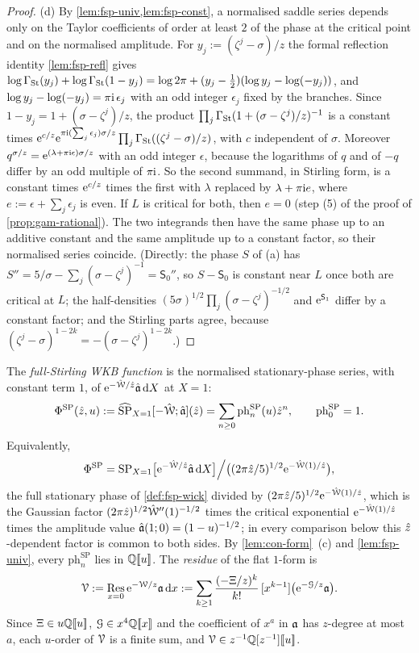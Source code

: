 \begin{proof}
(d) By \cref{lem:fsp-univ,lem:fsp-const}, a normalised saddle series depends only on the Taylor coefficients of order at least $2$ of the phase at the critical point and on the normalised amplitude. For $y_j:=(\zeta^j-\sigma)/z$ the formal reflection identity \cref{lem:fsp-refl} gives $\log\Gamma_{\mathrm{St}}(y_j)+\log\Gamma_{\mathrm{St}}(1-y_j)=\log2\pi+(y_j-\frac12)(\log y_j-\log(-y_j))$, and $\log y_j-\log(-y_j)=\pi\mathrm{i}\,\epsilon_j$ with an odd integer $\epsilon_j$ fixed by the branches. Since $1-y_j=1+(\sigma-\zeta^j)/z$, the product $\prod_j\Gamma_{\mathrm{St}}(1+(\sigma-\zeta^j)/z)^{-1}$ is a constant times $\mathrm{e}^{c/z}\mathrm{e}^{\pi\mathrm{i}(\sum_j\epsilon_j)\sigma/z}\prod_j\Gamma_{\mathrm{St}}((\zeta^j-\sigma)/z)$, with $c$ independent of $\sigma$. Moreover $q^{\sigma/z}=\mathrm{e}^{(\lambda+\pi\mathrm{i}\epsilon)\sigma/z}$ with an odd integer $\epsilon$, because the logarithms of $q$ and of $-q$ differ by an odd multiple of $\pi\mathrm{i}$. So the second summand, in Stirling form, is a constant times $\mathrm{e}^{c/z}$ times the first with $\lambda$ replaced by $\lambda+\pi\mathrm{i} e$, where $e:=\epsilon+\sum_j\epsilon_j$ is even. If $L$ is critical for both, then $e=0$ (step (5) of the proof of \cref{prop:gam-rational}). The two integrands then have the same phase up to an additive constant and the same amplitude up to a constant factor, so their normalised series coincide. (Directly: the phase $S$ of (a) has $S''=5/\sigma-\sum_j(\sigma-\zeta^j)^{-1}=\mathsf S_0''$, so $S-\mathsf S_0$ is constant near $L$ once both are critical at $L$; the half-densities $(5\sigma)^{1/2}\prod_j(\sigma-\zeta^j)^{-1/2}$ and $\mathrm{e}^{\mathsf S_1}$ differ by a constant factor; and the Stirling parts agree, because $(\zeta^j-\sigma)^{1-2k}=-(\sigma-\zeta^j)^{1-2k}$.)
\end{proof}

\begin{defn}
\label{def:con-PhiSP}
The \emph{full-Stirling WKB function} is the normalised stationary-phase series, with constant term $1$, of $\mathrm{e}^{-\hat{\mathcal{W}}/\hat{z}}\hat{\mathfrak{a}}\,\mathrm{d} X$ at $X=1$:
\[
\Phi^{\mathrm{SP}}(\hat{z},u):=\widehat{\mathrm{SP}}_{X=1}[-\hat{\mathcal{W}};\hat{\mathfrak{a}}](\hat{z})=\sum_{n\geq0}\mathrm{ph}^{\mathrm{SP}}_n(u)\hat{z}^n,\qquad\mathrm{ph}^{\mathrm{SP}}_0=1 .
\]
Equivalently,
\[
\Phi^{\mathrm{SP}}=\mathrm{SP}_{X=1}\bigl[\mathrm{e}^{-\hat{\mathcal{W}}/\hat{z}}\hat{\mathfrak{a}}\,\mathrm{d} X\bigr]\Big/\bigl((2\pi\hat{z}/5)^{1/2}\mathrm{e}^{-\hat{\mathcal{W}}(1)/\hat{z}}\bigr),
\]
the full stationary phase of \cref{def:fsp-wick} divided by $(2\pi\hat{z}/5)^{1/2}\mathrm{e}^{-\hat{\mathcal{W}}(1)/\hat{z}}$, which is the Gaussian factor $(2\pi\hat{z})^{1/2}\hat{\mathcal{W}}''(1)^{-1/2}$ times the critical exponential $\mathrm{e}^{-\hat{\mathcal{W}}(1)/\hat{z}}$ times the amplitude value $\hat{\mathfrak{a}}(1;0)=(1-u)^{-1/2}$; in every comparison below this $\hat{z}$-dependent factor is common to both sides. By \cref{lem:con-form}~(c) and \cref{lem:fsp-univ}, every $\mathrm{ph}^{\mathrm{SP}}_n$ lies in $\mathbb{Q}[\![ u ]\!]$. The \emph{residue} of the flat $1$-form is
\[
\mathcal{V}:=\operatorname*{Res}_{x=0}\mathrm{e}^{-\mathcal{W}/z}\mathfrak{a}\,\mathrm{d} x:=\sum_{k\geq1}\frac{(-\Xi/z)^k}{k!}\,[x^{k-1}]\bigl(\mathrm{e}^{-\mathcal{G}/z}\mathfrak{a}\bigr).
\]
Since $\Xi\in u\mathbb{Q}[\![ u ]\!]$, $\mathcal{G}\in x^4\mathbb{Q}[\![ x ]\!]$ and the coefficient of $x^a$ in $\mathfrak{a}$ has $z$-degree at most $a$, each $u$-order of $\mathcal{V}$ is a finite sum, and $\mathcal{V}\in z^{-1}\mathbb{Q}[z^{-1}][\![ u ]\!]$.
\end{defn}

